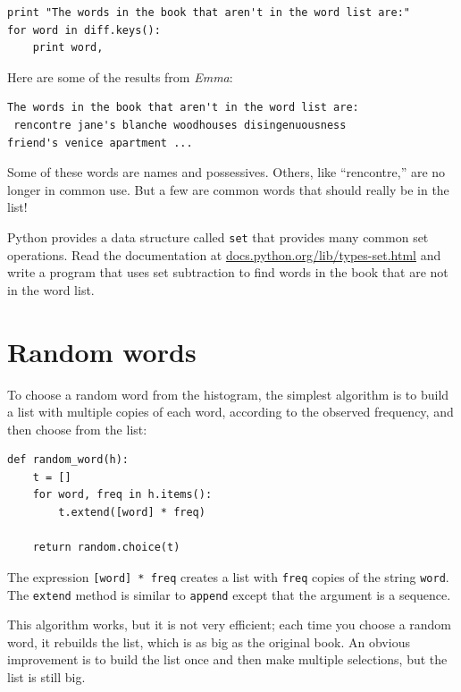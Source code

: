 \documentclass[10pt]{book}
\begin{document}
{\begin{verbatim}
print "The words in the book that aren't in the word list are:"
for word in diff.keys():
    print word,
\end{verbatim}
\afterverb
%
Here are some of the results from {\em Emma}:

\beforeverb
\begin{verbatim}
The words in the book that aren't in the word list are:
 rencontre jane's blanche woodhouses disingenuousness 
friend's venice apartment ...
\end{verbatim}
\afterverb
%
Some of these words are names and possessives.  Others, like
``rencontre,'' are no longer in common use.  But a few are common
words that should really be in the list!

\begin{ex}


Python provides a data structure called {\tt set} that provides many
common set operations.  Read the documentation at
\url{docs.python.org/lib/types-set.html} and write a program
that uses set subtraction to find words in the book that are not in
the word list.
\end{ex}


\section{Random words}
\label{randomwords}


To choose a random word from the histogram, the simplest algorithm
is to build a list with multiple copies of each word, according
to the observed frequency, and then choose from the list:

\beforeverb
\begin{verbatim}
def random_word(h):
    t = []
    for word, freq in h.items():
        t.extend([word] * freq)

    return random.choice(t)
\end{verbatim}
\afterverb
%
The expression {\tt [word] * freq} creates a list with {\tt freq}
copies of the string {\tt word}.  The {\tt extend}
method is similar to {\tt append} except that the argument is
a sequence.

\begin{ex}
\label{randhist}


This algorithm works, but it is not very efficient; each time you
choose a random word, it rebuilds the list, which is as big as
the original book.  An obvious improvement is to build the list
once and then make multiple selections, but the list is still big.


\end{ex}}
\end{document}
